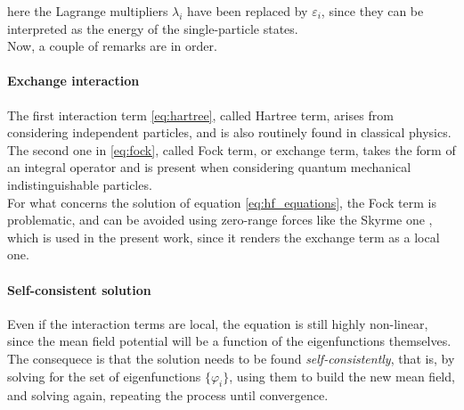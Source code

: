 here the Lagrange multipliers $\lambda_i$ have been replaced by $\varepsilon_i$, since they can be interpreted as the energy of the single-particle states.\\
Now, a couple of remarks are in order.
\paragraph{Exchange interaction}
The first interaction term \eqref{eq:hartree}, called Hartree term, arises from considering independent particles, and is also routinely found in classical physics. The second one in \eqref{eq:fock}, called Fock term, or exchange term, takes the form of an integral operator and is present when considering quantum mechanical indistinguishable particles.
\\For what concerns the solution of equation \eqref{eq:hf_equations}, the Fock term is problematic, and can be avoided using zero-range forces like the Skyrme one \cite{SKYRME1958615}, which is used in the present work, since it renders the exchange term as a local one.
\paragraph{Self-consistent solution}
Even if the interaction terms are local, the equation is still highly non-linear, since the mean field potential will be a function of the eigenfunctions themselves. The consequece is that the solution needs to be found \textit{self-consistently}, that is, by solving for the set of eigenfunctions $\{\varphi_i\}$, using them to build the new mean field, and solving again, repeating the process until convergence.
